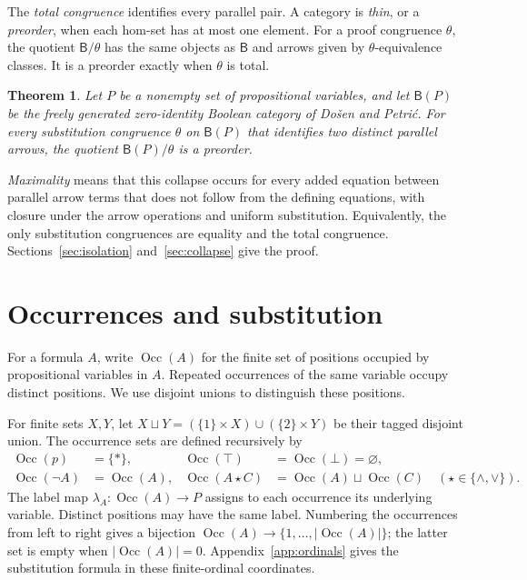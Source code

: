 \documentclass[11pt]{article}
\newtheorem{theorem}{Theorem}[section]
\newcommand{\B}{\mathsf B}
\newcommand{\Occ}{\operatorname{Occ}}
\begin{document}
The \emph{total congruence} identifies every parallel pair. A category
is \emph{thin}, or a \emph{preorder}, when each hom-set has at most one
element. For a proof congruence $\theta$, the quotient $\B/\theta$
has the same objects as $\B$ and arrows given by $\theta$-equivalence
classes. It is a preorder exactly when $\theta$ is total.

\begin{theorem}\label{thm:main}
Let $P$ be a nonempty set of propositional variables, and let
$\B(P)$ be the freely generated zero-identity Boolean category of
Do\v{s}en and Petri\'c. For every substitution congruence $\theta$
on $\B(P)$ that identifies two distinct parallel arrows, the
quotient $\B(P)/\theta$ is a preorder.
\end{theorem}

\emph{Maximality} means that this collapse occurs for every added
equation between parallel arrow terms that does not follow from the
defining equations, with closure under the arrow operations and
uniform substitution. Equivalently, the only substitution
congruences are equality and the total congruence.
Sections~\ref{sec:isolation} and~\ref{sec:collapse} give the proof.

\section{Occurrences and substitution}\label{sec:occurrences}

For a formula $A$, write $\Occ(A)$ for the finite set of positions
occupied by propositional variables in $A$. Repeated occurrences of the
same variable occupy distinct positions. We use disjoint unions to
distinguish these positions.

For finite sets $X,Y$, let
$X\sqcup Y=(\{1\}\times X)\cup(\{2\}\times Y)$ be their tagged
disjoint union. The occurrence sets are defined recursively by
\[
 \begin{aligned}
 \Occ(p)&=\{*\},&
 \Occ(\top)&=\Occ(\bot)=\varnothing,\\
 \Occ(\neg A)&=\Occ(A),&
 \Occ(A\mathbin\star C)&=\Occ(A)\sqcup\Occ(C)
       \quad(\star\in\{\wedge,\vee\}).
 \end{aligned}
\]
The label map $\lambda_A:\Occ(A)\to P$ assigns to each occurrence
its underlying variable. Distinct positions may have the same label.
Numbering the occurrences from left to right gives a bijection
$\Occ(A)\to\{1,\ldots,|\Occ(A)|\}$; the latter set is empty when
$|\Occ(A)|=0$. Appendix~\ref{app:ordinals} gives the substitution
formula in these finite-ordinal coordinates.
\end{document}
